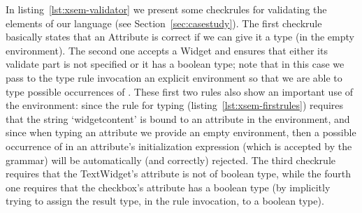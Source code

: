 In listing~\ref{lst:xsem-validator} we present some checkrules for validating
the elements of our language (see Section~\ref{sec:casestudy}).  The first
checkrule basically states that an Attribute is correct if we can give it a type
(in the empty environment).  The second one accepts a Widget and ensures that
either its validate part is not specified or it has a boolean type; note that in
this case we pass to the type rule invocation an explicit environment so that we
are able to type possible occurrences of .  These first
two rules also show an important use of the environment: since the rule for
typing  (listing~\ref{lst:xsem-firstrules}) requires that
the string `widgetcontent' is bound to an attribute in the environment, and
since when typing an attribute we provide an empty environment, then a possible
occurrence of  in an attribute's initialization expression
(which is accepted by the grammar) will be automatically (and correctly)
rejected.
The third checkrule requires that the TextWidget's attribute is not of boolean
type, while the fourth one requires that the checkbox's attribute has a boolean
type (by implicitly trying to assign the result type, in the rule invocation, to
a boolean type).
